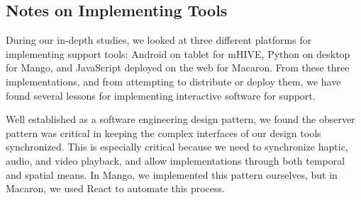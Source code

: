 





%
%
\subsection{Notes on Implementing \haxd Tools}
During our in-depth studies, we looked at three different platforms for implementing \haxd support tools: Android on tablet for mHIVE, Python on desktop for Mango, and JavaScript deployed on the web for Macaron.
From these three implementations, and from attempting to distribute or deploy them, we have found several lessons for implementing interactive software for \haxd support.

Well established as a software engineering design pattern, we found the observer pattern was critical in keeping the complex interfaces of our design tools synchronized.
This is especially critical because we need to synchronize haptic, audio, and video playback, and allow implementations through both temporal and spatial means.
In Mango, we implemented this pattern ourselves, but in Macaron, we used React to automate this process.

